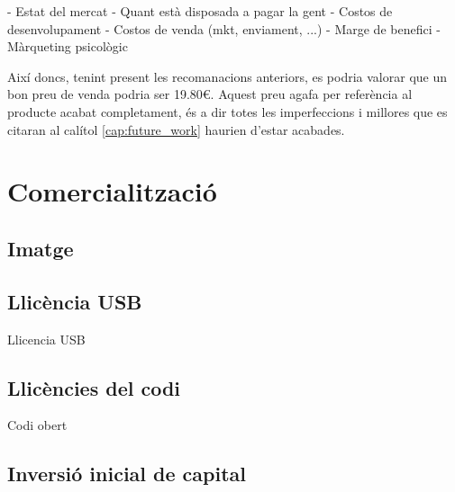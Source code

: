 - Estat del mercat
- Quant està disposada a pagar la gent
- Costos de desenvolupament
- Costos de venda (mkt, enviament, ...)
- Marge de benefici
- Màrqueting psicològic

Així doncs, tenint present les recomanacions anteriors, es podria valorar que
un bon preu de venda podria ser 19.80€. Aquest preu agafa per referència al
producte acabat completament, és a dir totes les imperfeccions i millores que
es citaran al calítol \ref{cap:future_work} haurien d'estar acabades.

\section{Comercialització}
\subsection{Imatge}
\subsection{Llicència USB}
Llicencia USB
\subsection{Llicències del codi}
Codi obert

\subsection{Inversió inicial de capital}
